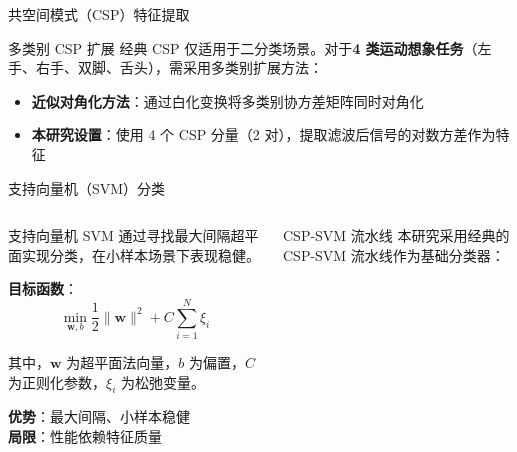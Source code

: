 {\begin{frame}{共空间模式（CSP）特征提取}
    \begin{alertblock}{多类别 CSP 扩展}
        \scriptsize
        经典 CSP 仅适用于二分类场景。对于\textbf{4 类运动想象任务}（左手、右手、双脚、舌头），需采用多类别扩展方法\cite{blankertz2008optimizing}：
        \begin{itemize}
            \item \textbf{近似对角化方法}：通过白化变换将多类别协方差矩阵同时对角化
            \item \textbf{本研究设置}：使用 4 个 CSP 分量（2 对），提取滤波后信号的对数方差作为特征
        \end{itemize}
    \end{alertblock}

\end{frame}

\begin{frame}{支持向量机（SVM）分类}
    \begin{columns}[T]
        \begin{block}{支持向量机}
            \scriptsize
            SVM 通过寻找最大间隔超平面实现分类，在小样本场景下表现稳健。\cite{lotte2007review}
            
            \vspace{0.2cm}
            \textbf{目标函数}：
            \begin{equation*}
            \min_{\mathbf{w}, b} \frac{1}{2} \|\mathbf{w}\|^2 + C \sum_{i=1}^N \xi_i
            \end{equation*}
            
            \vspace{0.2cm}
            其中，$\mathbf{w}$ 为超平面法向量，$b$ 为偏置，$C$ 为正则化参数，$\xi_i$ 为松弛变量。
            
            \vspace{0.2cm}
            \textbf{优势}：最大间隔、小样本稳健 \\
            \textbf{局限}：性能依赖特征质量
        \end{block}

        \begin{block}{CSP-SVM 流水线}
            \scriptsize
            本研究采用经典的 CSP-SVM 流水线作为基础分类器：
            
            \vspace{0.3cm}
            \centering
            

\end{block}
\end{columns}
\end{frame}}
